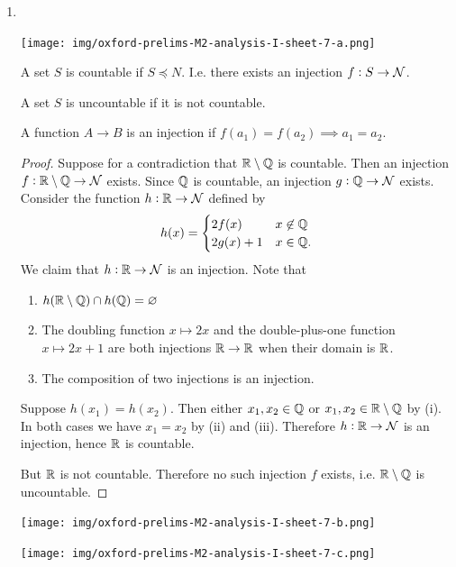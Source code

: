 \begin{enumerate}
  \newpage
\item~\\
  \begin{mdframed}
    \texttt{[image: img/oxford-prelims-M2-analysis-I-sheet-7-a.png]}
  \end{mdframed}
  \begin{definition*}[Countable]
    A set $S$ is countable if $S \preceq N$. I.e. there exists an injection $f:S \to \mathcal{N}$.
  \end{definition*}
  \begin{definition*}[Uncountable]
    A set $S$ is uncountable if it is not countable.
  \end{definition*}
  \begin{definition*}[Injection]
    A function $A \to B$ is an injection if $f(a_1) = f(a_2) \implies a_1 = a_2$.
  \end{definition*}
  \begin{proof}
    Suppose for a contradiction that $\mathbb{R} \setminus \mathbb{Q}$ is countable. Then an injection
    $f:\mathbb{R} \setminus \mathbb{Q} \to \mathcal{N}$ exists. Since $\mathbb{Q}$ is countable, an injection $g:\mathbb{Q} \to \mathcal{N}$
    exists. Consider the function $h:\mathbb{R} \to \mathcal{N}$ defined by
    \begin{align*}
      h(x) =
      \begin{cases}
        2f(x) &x \not\in\mathbb{Q}\\
        2g(x) + 1 &x \in \mathbb{Q}.
      \end{cases}
    \end{align*}
    We claim that $h:\mathbb{R} \to \mathcal{N}$ is an injection. Note that
    \begin{enumerate}[label=(\roman*)]
    \item $h(\mathbb{R}\setminus\mathbb{Q}) \cap h(\mathbb{Q}) = \varnothing$
    \item The doubling function $x \mapsto 2x$ and the double-plus-one function $x \mapsto 2x + 1$
      are both injections $\mathbb{R} \to \mathbb{R}$ when their domain is $\mathbb{R}$.
    \item The composition of two injections is an injection.
    \end{enumerate}
    Suppose $h(x_1) = h(x_2)$. Then either $x_1, x_2 \in \mathbb{Q}$ or $x_1, x_2 \in \mathbb{R}\setminus\mathbb{Q}$ by
    (i). In both cases we have $x_1 = x_2$ by (ii) and (iii). Therefore $h:\mathbb{R} \to \mathcal{N}$ is an
    injection, hence $\mathbb{R}$ is countable.

    But $\mathbb{R}$ is not countable. Therefore no such injection $f$ exists, i.e. $\mathbb{R}\setminus\mathbb{Q}$ is
    uncountable.
  \end{proof}
  \begin{mdframed}
    \texttt{[image: img/oxford-prelims-M2-analysis-I-sheet-7-b.png]}
  \end{mdframed}
  \begin{mdframed}
    \texttt{[image: img/oxford-prelims-M2-analysis-I-sheet-7-c.png]}
  \end{mdframed}

\end{enumerate}


